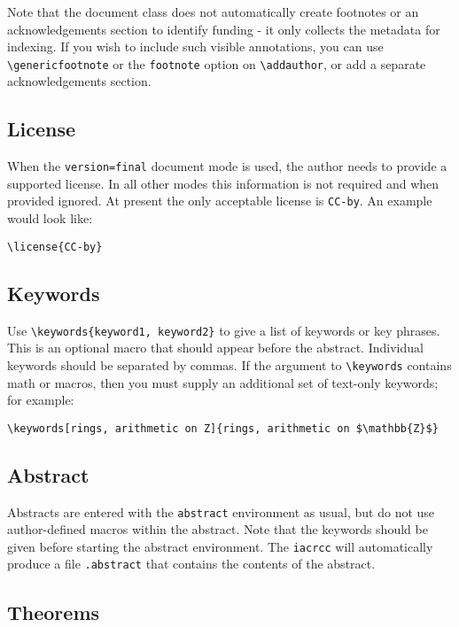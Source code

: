 \documentclass{iacrcc}
\begin{document}
Note that the document class does not automatically create footnotes
or an acknowledgements section to identify funding - it only collects
the metadata for indexing. If you wish to include such visible
annotations, you can use \texttt{\textbackslash genericfootnote} or
the \texttt{footnote} option on \texttt{\textbackslash addauthor}, or
add a separate acknowledgements section.

\subsection{License}
When the \texttt{version=final} document mode is used, the author needs
to provide a supported license.  In all other modes this information
is not required and when provided ignored.  At present the only
acceptable license is \texttt{CC-by}.  An example would look like:

\begin{verbatim}
\license{CC-by}
\end{verbatim}

\subsection{Keywords}
Use \texttt{\textbackslash keywords\{keyword1, keyword2\}} to give a
list of keywords or key phrases. This is an optional macro that should
appear before the abstract.  Individual keywords should be separated
by commas. If the argument to \texttt{\textbackslash keywords}
contains math or macros, then you must supply an additional set of
text-only keywords; for example:

\texttt{\textbackslash keywords[rings, arithmetic on Z]\{rings, arithmetic on \$\textbackslash mathbb\{Z\}\$\}}

\subsection{Abstract}
Abstracts are entered with the \texttt{abstract} environment as usual,
but do not use author-defined macros within the abstract.  Note that
the keywords should be given before starting the abstract
environment. The \texttt{iacrcc} will automatically produce a file
\texttt{.abstract} that contains the contents of the abstract.

\subsection{Theorems}
\end{document}
